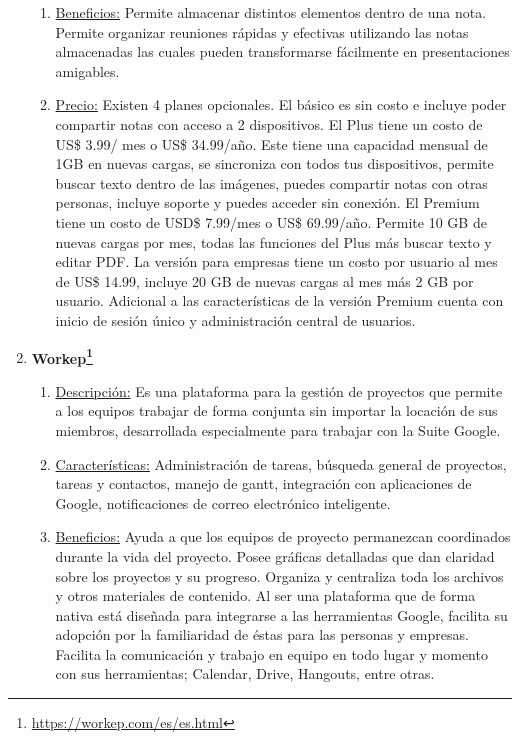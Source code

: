 \begin{enumerate}[1.]
\begin{enumerate}[a]
	    \item \underline{Beneficios:} Permite almacenar distintos elementos dentro de una nota. Permite organizar reuniones rápidas y efectivas utilizando las notas almacenadas las cuales pueden transformarse fácilmente en presentaciones amigables.
	    \item \underline{Precio:} Existen 4 planes opcionales. El básico es sin costo e incluye poder compartir notas con acceso a 2 dispositivos. El Plus tiene un costo de US\$ 3.99/ mes o US\$ 34.99/año. Este tiene una capacidad mensual de 1GB en nuevas cargas, se sincroniza con todos tus dispositivos, permite buscar texto dentro de las imágenes, puedes compartir notas con otras personas, incluye soporte y puedes acceder sin conexión. El Premium tiene un  costo de USD\$ 7.99/mes o US\$ 69.99/año. Permite 10 GB de nuevas cargas por mes, todas las funciones del Plus más buscar texto y editar PDF. La versión para empresas tiene un costo por usuario al mes de US\$ 14.99, incluye 20 GB de nuevas cargas al mes más 2 GB por usuario. Adicional a las características de la versión Premium cuenta con inicio de sesión único y administración central de usuarios.
    \end{enumerate}	    
    \item \textbf{Workep\footnote{\url{https://workep.com/es/es.html}}}    
    \begin{enumerate}[a]
	    \item \underline{Descripción:} Es una plataforma para la gestión de proyectos que permite a los equipos trabajar de forma conjunta sin importar la locación de sus miembros, desarrollada especialmente para trabajar con la Suite Google.  
		\item \underline{Características:} Administración de tareas, búsqueda general de proyectos, tareas y contactos, manejo de gantt, integración con aplicaciones de Google, notificaciones de correo electrónico inteligente.
	    \item \underline{Beneficios:} Ayuda a que los equipos de proyecto permanezcan coordinados durante la vida del proyecto. Posee gráficas detalladas que dan claridad sobre los proyectos y su progreso. Organiza y centraliza toda los archivos y otros materiales de contenido. Al ser una plataforma que de forma nativa está diseñada para integrarse a las herramientas Google, facilita su adopción por la familiaridad de éstas para las personas y empresas. Facilita la comunicación y trabajo en equipo en todo lugar y momento con sus herramientas; Calendar, Drive, Hangouts, entre otras. 

\end{enumerate}
\end{enumerate}

